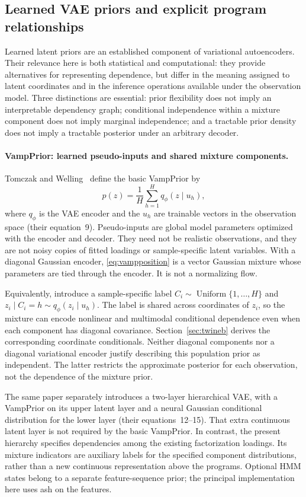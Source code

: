 \subsection{Learned VAE priors and explicit program relationships}
\label{sec:vaepriors}
Learned latent priors are an established component of variational
autoencoders. Their relevance here is both statistical and computational:
they provide alternatives for representing dependence, but differ in the
meaning assigned to latent coordinates and in the inference operations
available under the observation model. Three distinctions are essential:
prior flexibility does not imply an interpretable dependency graph;
conditional independence within a mixture component does not imply
marginal independence; and a tractable prior density does not imply a
tractable posterior under an arbitrary decoder.

\paragraph{VampPrior: learned pseudo-inputs and shared mixture components.}
Tomczak and Welling~\cite{vampprior} define the basic VampPrior by
\begin{equation}\label{eq:vampposition}
p(z)=\frac1H\sum_{h=1}^Hq_\phi(z\mid u_h),
\end{equation}
where \(q_\phi\) is the VAE encoder and the \(u_h\) are trainable vectors
in the observation space (their equation~9). Pseudo-inputs are global
model parameters optimized with the encoder and decoder. They need not
be realistic observations, and they are not noisy copies of fitted
loadings or sample-specific latent variables.
With a diagonal Gaussian encoder, \eqref{eq:vampposition} is a vector
Gaussian mixture whose parameters are tied through the encoder. It is
not a normalizing flow.

Equivalently, introduce a sample-specific label
\(C_i\sim\operatorname{Uniform}\{1,\ldots,H\}\) and
\(z_i\mid C_i=h\sim q_\phi(z_i\mid u_h)\).
The label is shared across coordinates of \(z_i\), so the mixture can
encode nonlinear and multimodal conditional dependence even when each
component has diagonal covariance. Section~\ref{sec:twineb} derives the
corresponding coordinate conditionals. Neither diagonal components nor
a diagonal variational encoder justify describing this population prior
as independent. The latter restricts the approximate posterior for each
observation, not the dependence of the mixture prior.

The same paper separately introduces a two-layer hierarchical VAE, with a
VampPrior on its upper latent layer and a neural Gaussian conditional
distribution for the lower layer (their equations~12--15).
That extra continuous latent layer is not required by the basic VampPrior.
In contrast, the present hierarchy specifies dependencies among the
existing factorization loadings. Its mixture indicators are auxiliary
labels for the specified component distributions, rather than a new
continuous representation above the programs. Optional HMM states belong to a separate feature-sequence prior;
the principal implementation here uses ash on the features.


